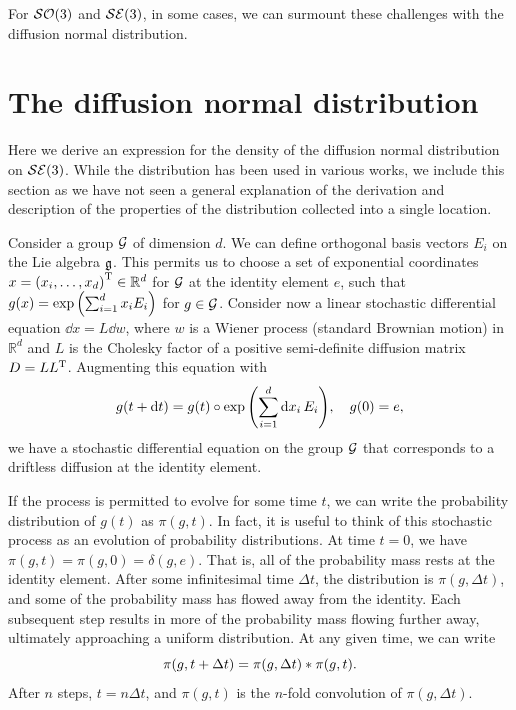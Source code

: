 \documentclass[../../main.tex]{subfiles}
\begin{document}
\begin{refsection}
	For $\mathcal{SO} (3)$ and $\mathcal{SE} (3)$, in some cases, we can surmount these challenges with the diffusion normal distribution.

	\section{The diffusion normal distribution}\label{diffusion-normal-distribution}

	Here we derive an expression for the density of the diffusion normal distribution on $\mathcal{SE} (3)$.
	While the distribution has been used in various works, we include this section as we have not seen a general explanation of the derivation and description of the properties of the distribution collected into a single location.

	Consider a group $\mathcal{G}$ of dimension $d$.
	We can define orthogonal basis vectors $E_i$ on the Lie algebra $\mathfrak{g}$.
	This permits us to choose a set of exponential coordinates $x = {(x_i, \ldots, x_d)}^\mathrm{T} \in \mathbb{R}^d$ for $\mathcal{G}$ at the identity element $e$, such that
	$g(x) = \exp \qty(\sum_{i=1}^d x_i E_i )$
	for $g \in \mathcal{G}$.
	Consider now a linear stochastic differential equation
	$\dd{x} = L \dd{w}$,
	where $w$ is a Wiener process (\ie standard Brownian motion) in $\mathbb{R}^d$ and $L$ is the Cholesky factor of a positive semi-definite diffusion matrix $D = L {L}^\mathrm{T}$.
	Augmenting this equation with
	$$g(t + \dd{t}) = g(t) \circ \exp \qty( \sum_{i=1}^d \dd{x_i} E_i ), \quad g(0) = e,$$
	we have a stochastic differential equation on the group $\mathcal{G}$ that corresponds to a driftless diffusion at the identity element.

	If the process is permitted to evolve for some time $t$, we can write the probability distribution of $g(t)$ as $\pi(g, t)$.
	In fact, it is useful to think of this stochastic process as an evolution of probability distributions.
	At time $t=0$, we have $\pi(g, t) = \pi(g, 0) = \delta(g, e)$.
	That is, all of the probability mass rests at the identity element.
	After some infinitesimal time $\Delta t$, the distribution is $\pi(g, \Delta t)$, and some of the probability mass has flowed away from the identity.
	Each subsequent step results in more of the probability mass flowing further away, ultimately approaching a uniform distribution.
	At any given time, we can write
	$$\pi(g, t + \Delta t) = \pi(g, \Delta t) * \pi(g, t).$$
	After $n$ steps, $t = n \Delta t$, and $\pi(g, t)$ is the $n$-fold convolution of $\pi(g, \Delta t)$.


\end{refsection}
\end{document}
